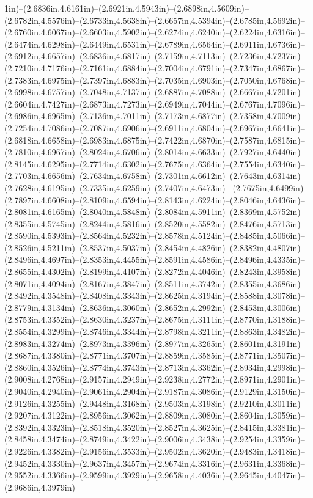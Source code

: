 1in)--(2.6836in,4.6161in)--(2.6921in,4.5943in)--(2.6898in,4.5609in)--(2.6782in,4.5576in)--(2.6733in,4.5638in)--(2.6657in,4.5394in)--(2.6785in,4.5692in)--(2.6760in,4.6067in)--(2.6603in,4.5902in)--(2.6274in,4.6240in)--(2.6224in,4.6316in)--(2.6474in,4.6298in)--(2.6449in,4.6531in)--(2.6789in,4.6564in)--(2.6911in,4.6736in)--(2.6912in,4.6657in)--(2.6836in,4.6817in)--(2.7159in,4.7113in)--(2.7236in,4.7237in)--(2.7210in,4.7176in)--(2.7161in,4.6884in)--(2.7004in,4.6791in)--(2.7347in,4.6867in)--(2.7383in,4.6975in)--(2.7397in,4.6883in)--(2.7035in,4.6903in)--(2.7050in,4.6768in)--(2.6998in,4.6757in)--(2.7048in,4.7137in)--(2.6887in,4.7088in)--(2.6667in,4.7201in)--(2.6604in,4.7427in)--(2.6873in,4.7273in)--(2.6949in,4.7044in)--(2.6767in,4.7096in)--(2.6986in,4.6965in)--(2.7136in,4.7011in)--(2.7173in,4.6877in)--(2.7358in,4.7009in)--(2.7254in,4.7086in)--(2.7087in,4.6906in)--(2.6911in,4.6804in)--(2.6967in,4.6641in)--(2.6818in,4.6658in)--(2.6983in,4.6875in)--(2.7422in,4.6870in)--(2.7587in,4.6815in)--(2.7810in,4.6967in)--(2.8024in,4.6706in)--(2.8014in,4.6633in)--(2.7927in,4.6440in)--(2.8145in,4.6295in)--(2.7714in,4.6302in)--(2.7675in,4.6364in)--(2.7554in,4.6340in)--(2.7703in,4.6656in)--(2.7634in,4.6758in)--(2.7301in,4.6612in)--(2.7643in,4.6314in)--(2.7628in,4.6195in)--(2.7335in,4.6259in)--(2.7407in,4.6473in)--
(2.7675in,4.6499in)--(2.7897in,4.6608in)--(2.8109in,4.6594in)--(2.8143in,4.6224in)--(2.8046in,4.6436in)--(2.8081in,4.6165in)--(2.8040in,4.5848in)--(2.8084in,4.5911in)--(2.8369in,4.5752in)--(2.8355in,4.5745in)--(2.8244in,4.5816in)--(2.8520in,4.5582in)--(2.8476in,4.5713in)--(2.8590in,4.5393in)--(2.8564in,4.5232in)--(2.8578in,4.5124in)--(2.8485in,4.5066in)--(2.8526in,4.5211in)--(2.8537in,4.5037in)--(2.8454in,4.4826in)--(2.8382in,4.4807in)--(2.8496in,4.4697in)--(2.8353in,4.4455in)--(2.8591in,4.4586in)--(2.8496in,4.4335in)--(2.8655in,4.4302in)--(2.8199in,4.4107in)--(2.8272in,4.4046in)--(2.8243in,4.3958in)--(2.8071in,4.4094in)--(2.8167in,4.3847in)--(2.8511in,4.3742in)--(2.8355in,4.3686in)--(2.8492in,4.3548in)--(2.8408in,4.3343in)--(2.8625in,4.3194in)--(2.8588in,4.3078in)--(2.8779in,4.3134in)--(2.8636in,4.3060in)--(2.8652in,4.2992in)--(2.8453in,4.3006in)--(2.8753in,4.3352in)--(2.8630in,4.3237in)--(2.8675in,4.3111in)--(2.8770in,4.3188in)--(2.8554in,4.3299in)--(2.8746in,4.3344in)--(2.8798in,4.3211in)--(2.8863in,4.3482in)--(2.8983in,4.3274in)--(2.8973in,4.3396in)--(2.8977in,4.3265in)--(2.8601in,4.3191in)--(2.8687in,4.3380in)--(2.8771in,4.3707in)--(2.8859in,4.3585in)--(2.8771in,4.3507in)--(2.8860in,4.3526in)--(2.8774in,4.3743in)--(2.8713in,4.3362in)--(2.8934in,4.2998in)--(2.9008in,4.2768in)--(2.9157in,4.2949in)--(2.9238in,4.2772in)--(2.8971in,4.2901in)--(2.9040in,4.2940in)--(2.9061in,4.2904in)--(2.9187in,4.3086in)--(2.9129in,4.3150in)--(2.9126in,4.3255in)--(2.9448in,4.3168in)--(2.9503in,4.3198in)--(2.9210in,4.3011in)--(2.9207in,4.3122in)--(2.8956in,4.3062in)--(2.8809in,4.3080in)--(2.8604in,4.3059in)--(2.8392in,4.3323in)--(2.8518in,4.3520in)--(2.8527in,4.3625in)--(2.8415in,4.3381in)--(2.8458in,4.3474in)--(2.8749in,4.3422in)--(2.9006in,4.3438in)--(2.9254in,4.3359in)--(2.9226in,4.3382in)--(2.9156in,4.3533in)--(2.9502in,4.3620in)--(2.9483in,4.3418in)--(2.9452in,4.3330in)--(2.9637in,4.3457in)--(2.9674in,4.3316in)--(2.9631in,4.3368in)--(2.9552in,4.3366in)--(2.9599in,4.3929in)--(2.9658in,4.4036in)--(2.9645in,4.4047in)--(2.9686in,4.3979in)
